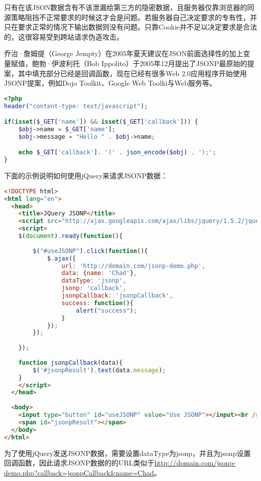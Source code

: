 只有在该JSON数据含有不该泄漏给第三方的隐密数据，且服务器仅靠浏览器的同源策略阻挡不正常要求的时候这才会是问题。若服务器自己决定要求的专有性，并只在要求正常的情况下输出数据则没有问题。只靠Cookie并不足以决定要求是合法的，这很容易受到跨站请求伪造攻击。

乔治·詹姆提（George Jempty）在2005年夏天建议在JSON前面选择性的加上变量赋值，鲍勃·伊波利托（Bob Ippolito）于2005年12月提出了JSONP最原始的提案，其中填充部分已经是回调函数，现在已经有很多Web 2.0应用程序开始使用JSONP提案，例如Dojo Toolkit、Google Web Toolki与Web服务等。

\begin{lstlisting}[language=PHP]
<?php
header("content-type: text/javascript");

if(isset($_GET['name']) && isset($_GET['callback'])) {
    $obj->name = $_GET['name'];
    $obj->message = "Hello " . $obj->name;

    echo $_GET['callback']. '(' . json_encode($obj) . ');';
}
\end{lstlisting}

下面的示例说明如何使用jQuery来请求JSONP数据：


\begin{lstlisting}[language=HTML]
<!DOCTYPE html>
<html lang="en">
  <head>
    <title>JQuery JSONP</title>
    <script src="http://ajax.googleapis.com/ajax/libs/jquery/1.5.2/jquery.min.js"></script>
    <script>
    $(document).ready(function(){
 
        $("#useJSONP").click(function(){
            $.ajax({
                url: 'http://domain.com/jsonp-demo.php',
                data: {name: 'Chad'},
                dataType: 'jsonp',
                jsonp: 'callback',
                jsonpCallback: 'jsonpCallback',
                success: function(){
                    alert("success");
                }
            });
        });
 
    });
     
    function jsonpCallback(data){
        $('#jsonpResult').text(data.message);
    }
    </script>
  </head> 
  
  <body>
    <input type="button" id="useJSONP" value="Use JSONP"></input><br /><br />
    <span id="jsonpResult"></span>
  </body>
</html>
\end{lstlisting}

为了使用jQuery发送JSONP数据，需要设置dataType为jsonp，并且为jsonp设置回调函数，因此请求JSONP数据的的URL类似于\url{http://domain.com/jsonp-demo.php?callback=jsonpCallback\&name=Chad}。

